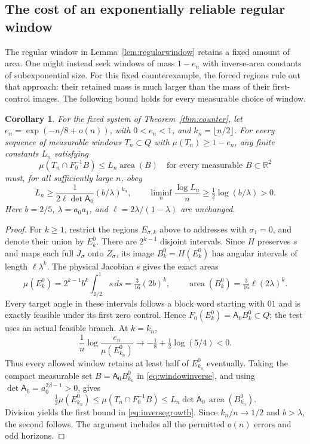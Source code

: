 \documentclass[11pt]{amsart}
\newtheorem{corollary}[theorem]{Corollary}
\theoremstyle{definition}
\theoremstyle{remark}
\newcommand{\R}{\mathbb R}
\newcommand{\area}{\operatorname{area}}
\numberwithin{equation}{section}
\begin{document}
\subsection{The cost of an exponentially reliable regular window}
The regular window in Lemma~\ref{lem:regularwindow} retains a fixed
amount of area. One might instead seek windows of mass $1-e_n$ with
inverse-area constants of subexponential size. For this fixed
counterexample, the forced regions rule out that approach: their
retained mass is much larger than the mass of their first-control
images. The following bound holds for every measurable choice of window.
\begin{corollary}\label{cor:inversecost}
For the fixed system of Theorem~\ref{thm:counter}, let
$e_n=\exp(-n/8+o(n))$, with $0<e_n<1$, and
$k_n=\lfloor n/2\rfloor$. For every sequence of measurable
windows $T_n\subset Q$ with $\mu(T_n)\ge1-e_n$, any finite
constants $L_n$ satisfying
\begin{equation}\label{eq:windowinverse}
\mu(T_n\cap F_0^{-1}B)\le L_n\area(B)
       \quad\text{for every measurable }B\subset\R^2
\end{equation}
must, for all sufficiently large $n$, obey
\begin{equation}\label{eq:inversegrowth}
L_n\ge\frac{1}{2\ell\det\mathsf A_0}
              (b/\lambda)^{k_n},\qquad
\liminf_n\frac{\log L_n}{n}
              \ge\tfrac12\log(b/\lambda)>0.
\end{equation}
Here $b=2/5$, $\lambda=a_0a_1$, and
$\ell=2\lambda/(1-\lambda)$ are unchanged.
\end{corollary}
\begin{proof}
For $k\ge1$, restrict the regions $E_{\sigma,k}$ above to
addresses with $\sigma_1=0$, and denote their union by $E_k^0$.
There are $2^{k-1}$ disjoint intervals. Since $H$ preserves $s$
and maps each full $J_\sigma$ onto $Z_\sigma$, its image
$B_k^0=H(E_k^0)$ has angular intervals of length $\ell\lambda^k$.
The physical Jacobian $s$ gives the exact areas
\[
\mu(E_k^0)=2^{k-1}b^k\int_{1/2}^1s\,ds
          =\tfrac3{16}(2b)^k,
\qquad
\area(B_k^0)=\tfrac3{16}\ell(2\lambda)^k.
\]
Every target angle in these intervals follows a block word starting
with $01$ and is exactly feasible under its first zero control.
Hence $F_0(E_k^0)=\mathsf A_0B_k^0\subset Q$; the test uses
an actual feasible branch. At $k=k_n$,
\[
\frac1n\log\frac{e_n}{\mu(E_{k_n}^0)}
 \longrightarrow-\tfrac18+\tfrac12\log(5/4)<0.
\]
Thus every allowed window retains at least half of $E_{k_n}^0$
eventually. Taking the compact measurable set
$B=\mathsf A_0B_{k_n}^0$ in \eqref{eq:windowinverse}, and using
$\det\mathsf A_0=a_0^{2\beta-1}>0$, gives
\[
\tfrac12\mu(E_{k_n}^0)
 \le\mu(T_n\cap F_0^{-1}B)
 \le L_n\det\mathsf A_0\,\area(B_{k_n}^0).
\]
Division yields the first bound in \eqref{eq:inversegrowth}.
Since $k_n/n\to1/2$ and $b>\lambda$, the second follows.
The argument includes all the permitted $o(n)$ errors and odd horizons.
\end{proof}
\end{document}
